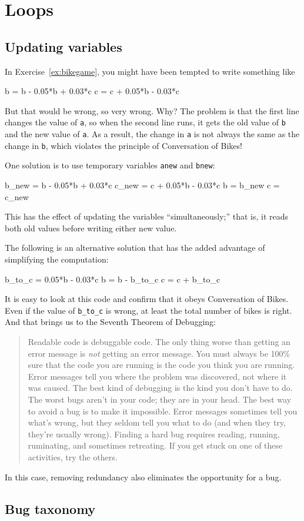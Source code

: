 \documentclass[
]{book}
\numberwithin{Answer}{chapter}
\numberwithin{Exercise}{chapter}
\newcommand{\displaythrm}[1]{%
    \ifthenelse{\equal{#1}{1}}%
        {Readable code is debuggable code.}{%
    \ifthenelse{\equal{#1}{2}}%
        {The only thing worse than getting an error message is {\em
         not} getting an error message.}{%
    \ifthenelse{\equal{#1}{3}}%
        {You must always be 100\% sure that the code you are running
         is the code you think you are running.}{%
    \ifthenelse{\equal{#1}{4}}%
        {Error messages tell you where the problem was discovered,
         not where it was caused.}{%
    \ifthenelse{\equal{#1}{5}}%
        {The best kind of debugging is the kind you don't have to do.}{%
    \ifthenelse{\equal{#1}{6}}%
        {The worst bugs aren't in your code; they are in your head.}{%
    \ifthenelse{\equal{#1}{7}}%
        {The best way to avoid a bug is to make it impossible.}{%
    \ifthenelse{\equal{#1}{8}}%
        {Error messages sometimes tell you what's wrong, but they
         seldom tell you what to do (and when they try, they're usually
         wrong).}{%
    \ifthenelse{\equal{#1}{9}}%
        {Finding a hard bug requires reading, running, ruminating,
         and sometimes retreating.  If you get stuck on one of these
         activities, try the others.}{%
    {}%
}}}}}}}}}}%
\begin{document}
\chapter{Loops}

\section{Updating variables}

In Exercise~\ref{ex:bikegame}, you might have been tempted to write something
like

\begin{code}
b = b - 0.05*b + 0.03*c
c = c + 0.05*b - 0.03*c
\end{code}

But that would be wrong, so very wrong.  Why?  The problem is that
the first line changes the value of {\tt a}, so when the second line
runs, it gets the old value of {\tt b} and the new value of {\tt a}.
As a result, the change in {\tt a} is not always the same as the
change in {\tt b}, which violates the principle of Conversation
of Bikes!

One solution is to use temporary variables {\tt anew} and {\tt bnew}:

\begin{code}
b_new = b - 0.05*b + 0.03*c
c_new = c + 0.05*b - 0.03*c
b = b_new
c = c_new
\end{code}

This has the effect of updating the variables ``simultaneously;'' that
is, it reads both old values before writing either new value.

The following is an alternative solution that
has the added advantage of simplifying the computation:

\begin{code}
b_to_c = 0.05*b - 0.03*c
b = b - b_to_c
c = c + b_to_c
\end{code}

It is easy to look at this code and confirm that it obeys Conversation
of Bikes.  Even if the value of \verb"b_to_c" is wrong, at least the total
number of bikes is right.  And that brings us to the Seventh Theorem of
Debugging:

\begin{quote}
\displaythrm{7}
\end{quote}

In this case, removing redundancy also eliminates the opportunity for
a bug.


\section{Bug taxonomy}
\end{document}
